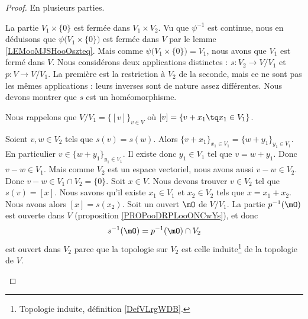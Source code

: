 \begin{proof}
    En plusieurs parties.
    \begin{subproof}
        La partie \( V_1\times \{ 0 \}\) est fermée dans \( V_1\times V_2\). Vu que \( \psi^{-1}\) est continue, nous en déduisons que \( \psi\big( V_1\times\{ 0 \} \big)\) est fermée dans \( V\) par le lemme \ref{LEMooMJSHooOszteq}. Mais comme \( \psi\big( V_1\times \{ 0 \} \big)=V_1\), nous avons que \( V_1\) est fermé dans \( V\).
        \spitem[\ref{ITEMooMUELooWdJQeW} \( \Rightarrow\) \ref{ITEMooDKOYooUpEfOR}]
        Nous considérons deux applications distinctes : \( s\colon V_2\to V/V_1\) et \( p\colon V\to V/V_1\). La première est la restriction à \( V_2\) de la seconde, mais ce ne sont pas les mêmes applications : leurs inverses sont de nature assez différentes. Nous devons montrer que \( s\) est un homéomorphisme.

        Nous rappelons que \( V/V_1=\{ [v] \}_{v\in V}\) où \( [v]=\{ v+x_1\tq x_1\in V_1 \}\). 

        \begin{subproof}
            Soient \( v,w\in V_2\) tels que \( s(v)=s(w)\). Alors \( \{ v+x_1 \}_{x_1\in V_1}=\{ w+y_1 \}_{y_1\in V_1}\). En particulier \( v\in \{ w+y_1 \}_{y_1\in V_1}\). Il existe donc \( y_1\in V_1\) tel que \( v=w+y_1\). Donc \( v-w\in V_1\). Mais comme \( V_2\) est un espace vectoriel, nous avons aussi \( v-w\in V_2\). Donc \( v-w\in V_1\cap V_2=\{ 0 \}\).
            Soit \( x\in V\). Nous devons trouver \( v\in V_2\) tel que \( s(v)=[x]\). Nous savons qu'il existe \( x_1\in V_1\) et \( x_2\in V_2\) tels que \( x=x_1+x_2\). Nous avons alors \( [x]=s(x_2)\).
            Soit un ouvert \( \mO\) de \( V/V_1\). La partie \( p^{-1}(\mO)\) est ouverte dans \( V\) (proposition \ref{PROPooDRPLooONCwYs}), et donc
            \begin{equation}
                s^{-1}(\mO)=p^{-1}(\mO)\cap V_2
            \end{equation}
            est ouvert dans \( V_2\) parce que la topologie sur \( V_2\) est celle induite\footnote{Topologie induite, définition \ref{DefVLrgWDB}.} de la topologie de \( V\).


\end{subproof}
\end{subproof}
\end{proof}
